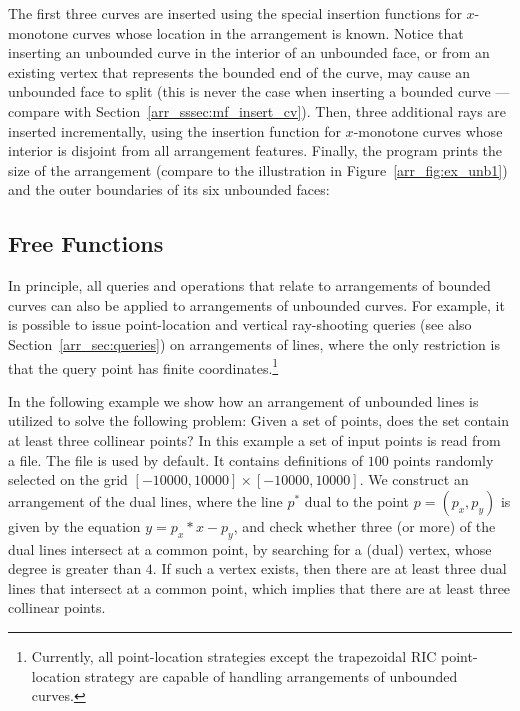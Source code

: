 The first three curves are inserted using the special insertion
functions for $x$-monotone curves whose location in the arrangement
is known. Notice that inserting an unbounded curve in the interior
of an unbounded face, or from an existing vertex that represents the
bounded end of the curve, may cause an unbounded face to split (this
is never the case when inserting a bounded curve --- compare with
Section~\ref{arr_sssec:mf_insert_cv}). Then, three additional rays are 
inserted incrementally, using the insertion function for $x$-monotone
curves whose interior is disjoint from all arrangement features.
Finally, the program prints the size of the arrangement (compare to
the illustration in Figure~\ref{arr_fig:ex_unb1}) and the outer
boundaries of its six unbounded faces:


\subsection{Free Functions\label{arr_ssec:unb_global}}

In principle, all queries and operations that relate to arrangements
of bounded curves can also be applied to arrangements of unbounded
curves. For example, it is possible to issue point-location and
vertical ray-shooting queries (see also Section~\ref{arr_sec:queries})
on arrangements of lines, where the only restriction is that the query
point has finite coordinates.\footnote{Currently, all point-location
strategies except the trapezoidal RIC point-location strategy are
capable of handling arrangements of unbounded curves.} 

In the following example we show how an arrangement of unbounded lines
is utilized to solve the following problem: Given a set of points, does
the set contain at least three collinear points? In this example a set
of input points is read from a file. The file   is
used by default. It contains definitions of $100$ points randomly
selected on the grid $[-10000,10000]\times[-10000,10000]$. We
construct an arrangement of the dual lines, where the line $p^{*}$
dual to the point $p = (p_x, p_y)$ is given by the equation
$y = p_x*x - p_y$, and check whether three (or more) of the dual lines
intersect at a common point, by searching for a (dual) vertex, whose
degree is greater than $4$. If such a vertex exists, then there are at
least three dual lines that intersect at a common point, which implies
that there are at least three collinear points.

